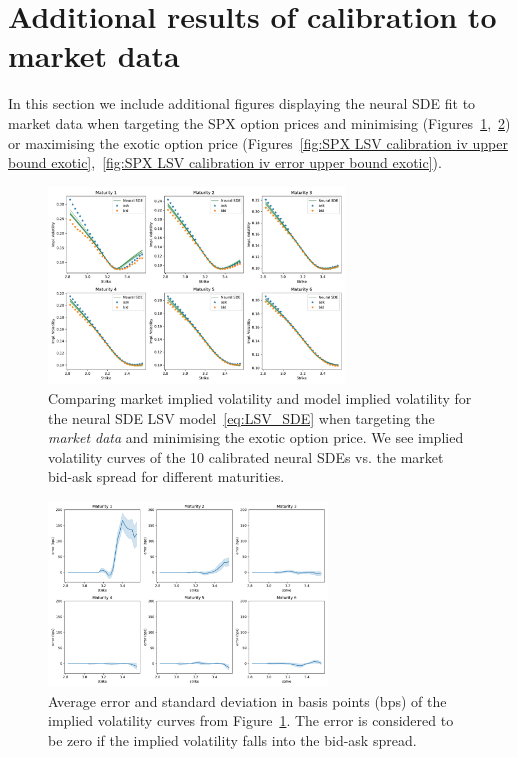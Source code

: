 \section{Additional results of calibration to market data}\label{apx:calibration market data}
In this section we include additional figures displaying the neural SDE fit to market data when targeting the SPX option prices and minimising (Figures~\ref{fig:SPX LSV calibration iv lower bound exotic},~\ref{fig:SPX LSV calibration iv error lower bound exotic}) or maximising the exotic option price (Figures~\ref{fig:SPX LSV calibration iv upper bound exotic},~\ref{fig:SPX LSV calibration iv error upper bound exotic}). 

\begin{figure}[H]
  \centering 
	\includegraphics[clip, width=0.7\textwidth]{content/reschap1/Figures/figures_SPX/iv_nsde_lower_bound.pdf}
  \caption{Comparing market implied volatility and model implied volatility for the neural SDE LSV model~\eqref{eq:LSV_SDE} when targeting the {\em market data} and minimising the exotic option price.
We see implied volatility curves of the 10 calibrated neural SDEs vs. the market bid-ask spread for different maturities.
}
\label{fig:SPX LSV calibration iv lower bound exotic}  
\end{figure}


\begin{figure}[H]
  \centering 
	\includegraphics[clip, width=0.66\textwidth]{content/reschap1/Figures/figures_SPX/iv_error_lower_bound.pdf}
  \caption{Average error and standard deviation in basis points (bps) of the implied volatility curves from Figure~\ref{fig:SPX LSV calibration iv lower bound exotic}. The error is considered to be zero if the implied volatility falls into the bid-ask spread.
}
\label{fig:SPX LSV calibration iv error lower bound exotic}  
\end{figure}


